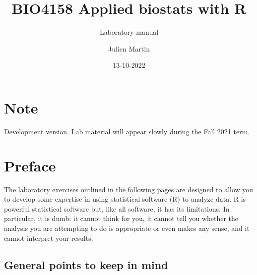\documentclass[
  12pt,
]{book}
\title{BIO4158 Applied biostats with R}
\subtitle{Laboratory manual}
\author{Julien Martin}
\date{13-10-2022}
\begin{document}
\maketitle



{
\setcounter{tocdepth}{1}
\tableofcontents
}
\hypertarget{note}{%
\chapter*{Note}\label{note}}

Development version. Lab material will appear slowly during the Fall 2021 term.

\hypertarget{preface}{%
\chapter*{Preface}\label{preface}}

The laboratory exercises outlined in the following pages are designed to allow you to develop some expertise in using statistical software (R)
to analyze data. R is powerful statistical software but, like all software, it has its limitations. In particular, it is dumb: it cannot think for you,
it cannot tell you whether the analysis you are attempting to do is appropriate or even makes any sense, and it cannot interpret your
results.

\hypertarget{general-points-to-keep-in-mind}{%
\section*{General points to keep in mind}\label{general-points-to-keep-in-mind}}
\end{document}
